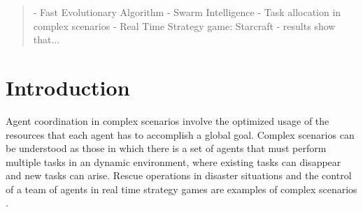 \documentclass[conference]{IEEEtran}
\begin{document}
\newcommand{\agentset}{\mathcal{I}}
\newcommand{\taskset}{\mathcal{J}}

\newcommand{\agtres}[1]{\ensuremath{r_{#1}}}
\newcommand{\agtcap}[2]{\ensuremath{k_{#1#2}}}
\newcommand{\rescspt}[2]{\ensuremath{c_{#1#2}}}

\newcommand{\stimulus}[1]{\ensuremath{s_#1}}
\newcommand{\respthresh}[2]{\ensuremath{\theta_{#1#2}}}
\newcommand{\tendency}[2]{\ensuremath{T_{#1#2}}}

\newcommand{\pop}[1]{\ensuremath{P^{(#1)}}}
\newcommand{\fit}[1]{\ensuremath{f_{#1}}}
\newcommand{\reliab}[1]{\ensuremath{w_{#1}}}
\newcommand{\simil}[2]{\ensuremath{\rho_{#1#2}}}
\newcommand{\relthresh}{\ensuremath{\tau}}

\newcommand{\popmax}{\ensuremath{\kappa}}
\newcommand{\genmax}{\ensuremath{\eta}}


\maketitle


\begin{abstract}
- Fast Evolutionary Algorithm
- Swarm Intelligence
- Task allocation in complex scenarios
- Real Time Strategy game: Starcraft
- results show that...
\end{abstract}






%
\IEEEpeerreviewmaketitle



\section{Introduction}
\label{sec:intro}
Agent coordination in complex scenarios involve the optimized usage of the resources that each agent has to accomplish a global goal. Complex scenarios can be understood as those in which there is a set of agents that must perform multiple tasks in an dynamic environment, where existing tasks can disappear and new tasks can arise. Rescue operations in disaster situations \cite{Kitano2000} and the control of a team of agents in real time strategy games are examples of complex scenarios \cite{Weber+2011}.
\end{document}
